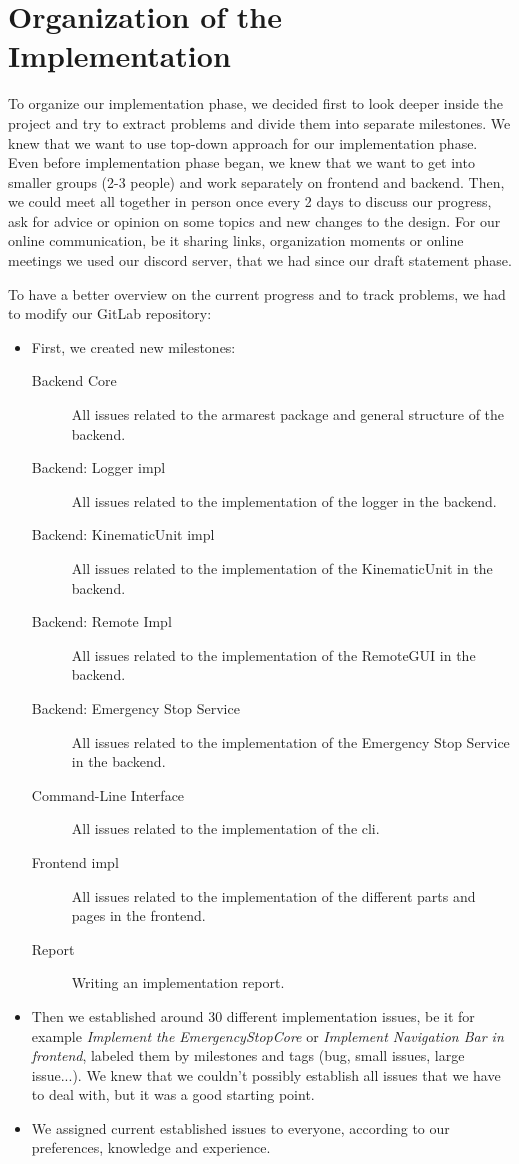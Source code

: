 
\chapter{Organization of the Implementation}

To organize our implementation phase, we decided first to look deeper inside the project and try to extract problems and divide them into separate milestones. We knew that we want to use top-down approach for our implementation phase. Even before implementation phase began, we knew that we want to get into smaller groups (2-3 people) and work separately on \gls{frontend} and \gls{backend}. Then, we could meet all together in person once every 2 days to discuss our progress, ask for advice or opinion on some topics and new changes to the design. For our online communication, be it sharing links, organization moments or online meetings we used our \gls{discord} server, that we had since our draft statement phase.

To have a better overview on the current progress and to track problems, we had to modify our GitLab repository:
\begin{itemize}
    \item First, we created new milestones:
          \begin{description}
              \item[Backend Core] All issues related to the armarest package and general structure of the backend.
              \item[Backend: Logger impl] All issues related to the implementation of the logger in the backend.
              \item[Backend: KinematicUnit impl] All issues related to the implementation of the KinematicUnit in the backend.
              \item[Backend: Remote Impl] All issues related to the implementation of the RemoteGUI in the backend.
              \item[Backend: Emergency Stop Service] All issues related to the implementation of the Emergency Stop Service in the backend.
              \item[Command-Line Interface] All issues related to the implementation of the \gls{cli}.
              \item[Frontend impl] All issues related to the implementation of the different parts and pages in the frontend.
              \item[Report] Writing an implementation report.
          \end{description}
    \item Then we established around 30 different implementation issues, be it for example \textit{Implement the EmergencyStopCore} or \textit{Implement Navigation Bar in frontend}, labeled them by milestones and tags (bug, small issues, large issue...). We knew that we couldn't possibly establish all issues that we have to deal with, but it was a good starting point.
    \item We assigned current established issues to everyone, according to our preferences, knowledge and experience.
\end{itemize}


